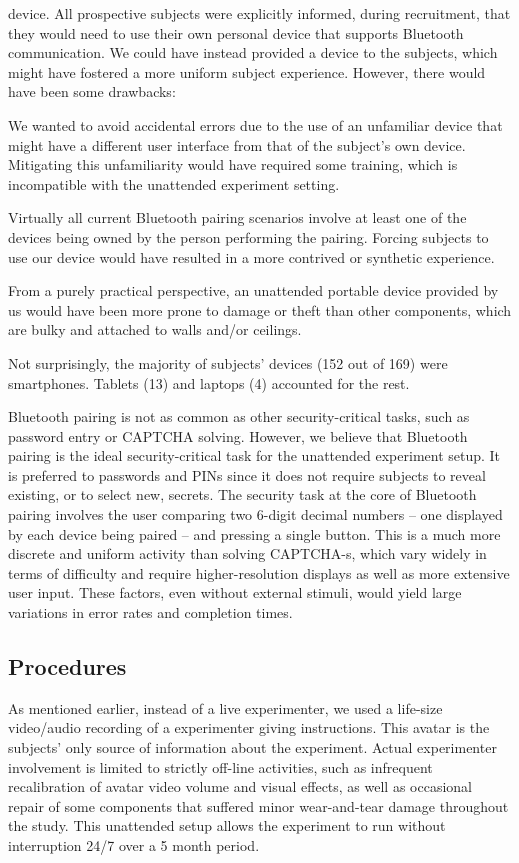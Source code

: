 \documentclass{llncs}
\begin{document}
% 
device. All prospective subjects were explicitly informed, during recruitment, that they would 
need to use their own personal device that supports Bluetooth communication. 
We could have instead provided a device to the subjects, which might have fostered a more uniform 
subject experience. However, there would have been some drawbacks: 
%
\begin{compactitem}
\item We wanted to avoid accidental errors due to the use of an 
unfamiliar device that might have a different user interface from that 
of the subject's own device. Mitigating this unfamiliarity would have required some training, 
which is incompatible with the unattended experiment setting. 
\item Virtually all current Bluetooth pairing scenarios involve at least one of the 
devices being owned by the person performing the pairing. Forcing subjects to use our
device would have resulted in a more contrived or synthetic experience.   
\item From a purely practical perspective, 
an unattended portable device provided by us would have been more
prone to damage or theft than other components, which are  bulky and 
attached to walls and/or ceilings.
\end{compactitem}
%
Not surprisingly, the majority of subjects' devices (152 out of 169) were smartphones. 
Tablets (13) and laptops (4) accounted for the rest.

Bluetooth pairing is not as common as other security-critical tasks,
such as password entry or CAPTCHA solving.
However, we believe that Bluetooth pairing is the ideal security-critical task 
for the unattended experiment setup. It is preferred to passwords and PINs 
since it does not require subjects to reveal existing, or to select new, secrets.
The security task at the core of  Bluetooth pairing involves the user comparing two 
6-digit decimal numbers -- one displayed by each device being paired -- and pressing 
a single button. This is a much more discrete and uniform activity than solving CAPTCHA-s, 
which vary widely in terms of difficulty and require higher-resolution displays as well as
more extensive user input. These factors, even without external stimuli, would yield 
large variations in error rates and completion times.
%

\subsection{Procedures} \label{proc}
%
As mentioned earlier, instead of a live experimenter, we used a life-size video/audio 
recording of a experimenter giving instructions. This avatar is the subjects' only source of information 
about the experiment. Actual experimenter involvement 
is limited to strictly off-line activities, 
such as infrequent recalibration of avatar video volume and visual effects, as well as 
occasional repair of some components that suffered minor wear-and-tear damage throughout the study. This unattended setup allows the experiment to run without interruption 24/7 over a 5 month period.
\end{document}
